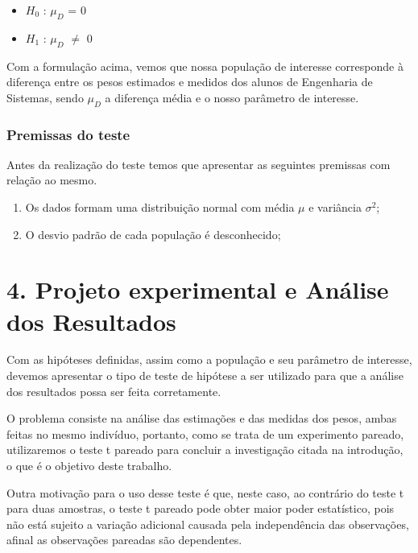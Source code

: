 \documentclass[]{article}
\begin{document}
\begin{itemize}
\item
  $H_0$ : $\mu_{D}$ = 0
\item
  $H_1$ : $\mu_{D}$ $\neq$ 0
\end{itemize}

\quad Com a formulação acima, vemos que nossa população de interesse
corresponde à diferença entre os pesos estimados e medidos dos alunos de
Engenharia de Sistemas, sendo $\mu_{D}$ a diferença média e o nosso
parâmetro de interesse.

\subsubsection{Premissas do teste}\label{premissas-do-teste}

\quad Antes da realização do teste temos que apresentar as seguintes
premissas com relação ao mesmo.

\begin{enumerate}
\def\labelenumi{\arabic{enumi}.}
\itemsep1pt\parskip0pt
\item
  Os dados formam uma distribuição normal com média $\mu$ e variância
  $\sigma^{2}$;
\item
  O desvio padrão de cada população é desconhecido;
\end{enumerate}

\section{4. Projeto experimental e Análise dos
Resultados}\label{projeto-experimental-e-analise-dos-resultados}

\quad Com as hipóteses definidas, assim como a população e seu parâmetro
de interesse, devemos apresentar o tipo de teste de hipótese a ser
utilizado para que a análise dos resultados possa ser feita
corretamente.

\quad O problema consiste na análise das estimações e das medidas dos
pesos, ambas feitas no mesmo indivíduo, portanto, como se trata de um
experimento pareado, utilizaremos o teste t pareado para concluir a
investigação citada na introdução, o que é o objetivo deste trabalho.

\quad Outra motivação para o uso desse teste é que, neste caso, ao
contrário do teste t para duas amostras, o teste t pareado pode obter
maior poder estatístico, pois não está sujeito a variação adicional
causada pela independência das observações, afinal as observações
pareadas são dependentes.
\end{document}
